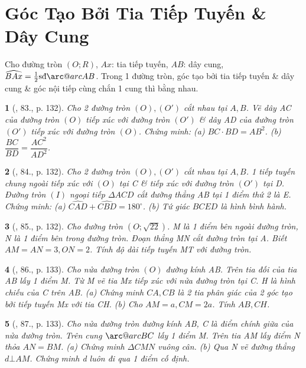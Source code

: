 \documentclass{article}
\makeatletter
\newcommand{\arc@char}{{\usefont{U}{tipa}{m}{n}\symbol{62}}}%
\newcommand{\arc}[1]{\mathpalette\arc@arc{#1}}
\newcommand{\arc@arc}[2]{%
	\sbox0{$\m@th#1#2$}%
	\vbox{
		\hbox{\resizebox{\wd0}{\height}{\arc@char}}
		\nointerlineskip
		\box0
	}%
}
\newtheorem{baitoan}{}
\makeatother
\begin{document}

\section{Góc Tạo Bởi Tia Tiếp Tuyến \& Dây Cung}
 Cho đường tròn $(O;R)$, $Ax$: tia tiếp tuyến, $AB$: dây cung, $\widehat{BAx} = \frac{1}{2}\mbox{\rm sđ}\arc{AB}$.  Trong 1 đường tròn, góc tạo bởi tia tiếp tuyến \& dây cung \& góc nội tiếp cùng chắn 1 cung thì bằng nhau.

\begin{baitoan}[\cite{Tuyen_Toan_9_old}, 83., p. 132]
	Cho 2 đường tròn $(O),(O')$ cắt nhau tại $A,B$. Vẽ dây AC của đường tròn $(O)$ tiếp xúc với đường tròn $(O')$ \& dây AD của đường tròn $(O')$ tiếp xúc với đường tròn $(O)$. Chứng minh: (a) $BC\cdot BD = AB^2$. (b) $\dfrac{BC}{BD} = \dfrac{AC^2}{AD^2}$.
\end{baitoan}

\begin{baitoan}[\cite{Tuyen_Toan_9_old}, 84., p. 132]
	Cho 2 đường tròn $(O),(O')$ cắt nhau tại $A,B$. 1 tiếp tuyến chung ngoài tiếp xúc với $(O)$ tại C \& tiếp xúc với đường tròn $(O')$ tại D. Đường tròn $(I)$ ngoại tiếp $\Delta ACD$ cắt đường thẳng AB tại 1 điểm thứ 2 là E. Chứng minh: (a) $\widehat{CAD} + \widehat{CBD} = 180^\circ$. (b) Tứ giác $BCED$ là hình bình hành.
\end{baitoan}

\begin{baitoan}[\cite{Tuyen_Toan_9_old}, 85., p. 132]
	Cho đường tròn $(O;\sqrt{22})$. M là 1 điểm bên ngoài đường tròn, N là 1 điểm bên trong đường tròn. Đoạn thẳng MN cắt đường tròn tại A. Biết $AM = AN = 3,ON = 2$. Tính độ dài tiếp tuyến MT với đường tròn.
\end{baitoan}

\begin{baitoan}[\cite{Tuyen_Toan_9_old}, 86., p. 133]
	Cho nửa đường tròn $(O)$ đường kính AB. Trên tia đối của tia AB lấy 1 điểm M. Từ M vẽ tia Mx tiếp xúc với nửa đường tròn tại C. H là hình chiếu của C trên AB. (a) Chứng minh $CA,CB$ là 2 tia phân giác của 2 góc tạo bởi tiếp tuyến Mx với tia CH. (b) Cho $AM = a,CM = 2a$. Tính $AB,CH$.
\end{baitoan}

\begin{baitoan}[\cite{Tuyen_Toan_9_old}, 87., p. 133]
	Cho nửa đường tròn đường kính AB, C là điểm chính giữa của nửa đường tròn. Trên cung $\arc{BC}$ lấy 1 điểm M. Trên tia AM lấy điểm N thỏa $AN = BM$. (a) Chứng minh $\Delta CMN$ vuông cân. (b) Qua N vẽ đường thẳng $d\bot AM$. Chứng minh d luôn đi qua 1 điểm cố định.
\end{baitoan}
\end{document}
